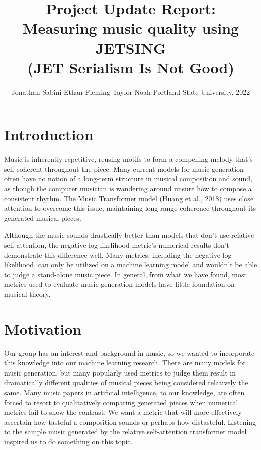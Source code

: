 \documentclass[11pt]{article}
\title{Project Update Report: \\ Measuring music quality using JETSING \\ (JET Serialism Is Not Good) }
\author{Jonathan Sabini \And Ethan Fleming \And Taylor Noah 
\AND
Portland State University, 2022}
\begin{document}
\maketitle

\begin{abstract}

\end{abstract}

\section{Introduction}
Music is inherently repetitive, reusing motifs to form a compelling melody that's self-coherent throughout the piece.
Many current models for music generation often have no notion of a long-term structure in musical composition and sound,
as though the computer musician is wandering around unsure how to compose a consistent rhythm.
The Music Transformer model (Huang et al., 2018) uses close attention to overcome this issue,
maintaining long-range coherence throughout its generated musical pieces.

Although the music sounds drastically better than models that don't use relative self-attention,
the negative log-likelihood metric's numerical results don't demonstrate this difference well.
Many metrics, including the negative log-likelihood, can only be utilized on a machine learning model and wouldn't be able to judge a stand-alone music piece.
In general, from what we have found, most metrics used to evaluate music generation models have little foundation on musical theory.

\section{Motivation}
Our group has an interest and background in music, so we wanted to incorporate this knowledge into our machine learning research.
There are many models for music generation, but many popularly used metrics to judge them result in dramatically different qualities of musical pieces being considered relatively the same.
Many music papers in artificial intelligence, to our knowledge, are often forced to resort to qualitatively comparing generated pieces when numerical metrics fail to show the contrast. We want a metric that will more effectively ascertain how tasteful a composition sounds or perhaps how distasteful.
Listening to the sample music generated by the relative self-attention transformer model inspired us to do something on this topic.
\end{document}
